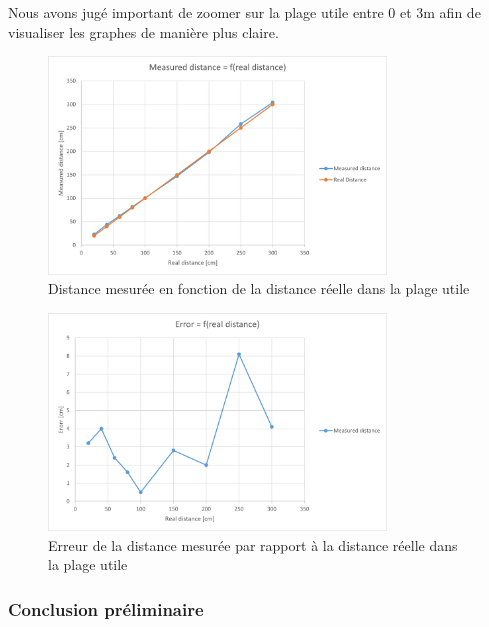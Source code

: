 Nous avons jugé important de zoomer sur la plage utile entre 0 et 3m afin de visualiser les graphes 
de manière plus claire.

\begin{figure}[H]
    \centering
    \includegraphics[width=0.8\textwidth]{Images/LiDAR/LiDARRealDistanceGraph_MesDist_Zoom.png}
    \caption{Distance mesurée en fonction de la distance réelle dans la plage utile}
    \label{RealDistanceMesGraphZoom}
\end{figure}

\begin{figure}[H]
    \centering
    \includegraphics[width=0.8\textwidth]{Images/LiDAR/LiDARRealDistanceGraph_MesDistError_Zoom.png}
    \caption{Erreur de la distance mesurée par rapport à la distance réelle dans la plage utile}
    \label{RealDistanceMesGraphErrorZoom}
\end{figure}

\subsubsection{Conclusion préliminaire}

